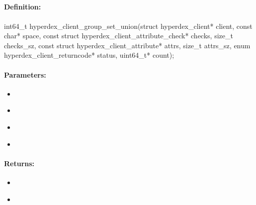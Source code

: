 \pagebreak
\subsection{}
\label{api:c:group_set_union}


\paragraph{Definition:}
\begin{ccode}
int64_t hyperdex_client_group_set_union(struct hyperdex_client* client,
        const char* space,
        const struct hyperdex_client_attribute_check* checks, size_t checks_sz,
        const struct hyperdex_client_attribute* attrs, size_t attrs_sz,
        enum hyperdex_client_returncode* status,
        uint64_t* count);
\end{ccode}

\paragraph{Parameters:}
\begin{itemize}[noitemsep]
\item {}\\

\item {}\\

\item {}\\

\item {}\\

\end{itemize}

\paragraph{Returns:}
\begin{itemize}[noitemsep]
\item {}\\

\item {}\\

\end{itemize}

